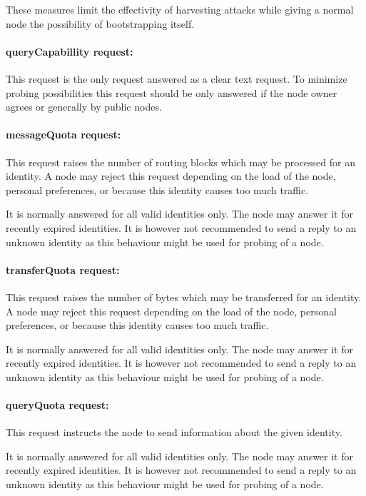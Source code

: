 These measures limit the effectivity of harvesting attacks while giving a normal node the possibility of bootstrapping itself.

\paragraph{queryCapabillity request:} This request is the only request answered as a clear text request. To minimize probing possibilities this request should be only answered if the node owner agrees or generally by public nodes.

\paragraph{messageQuota request:} This request raises the number of routing blocks which may be processed for an identity. A node may reject this request depending on the load of the node, personal preferences, or because this identity causes too much traffic.

It is normally answered for all valid identities only. The node may answer it for recently expired identities. It is however not recommended to send a reply to an unknown identity as this behaviour might be used for probing of a node.

\paragraph{transferQuota request:} This request raises the number of bytes which may be transferred for an identity. A node may reject this request depending on the load of the node, personal preferences, or because this identity causes too much traffic.

It is normally answered for all valid identities only. The node may answer it for recently expired identities. It is however not recommended to send a reply to an unknown identity as this behaviour might be used for probing of a node.

\paragraph{queryQuota request:} This request instructs the node to send information about the given identity.

It is normally answered for all valid identities only. The node may answer it for recently expired identities. It is however not recommended to send a reply to an unknown identity as this behaviour might be used for probing of a node.

